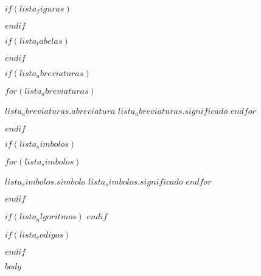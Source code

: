 \documentclass[
	oldfontcommands,
	sumario=abnt-6027-2012,
	12pt,
	openright,
	oneside,
	a4paper,
	english,
	english
	]{imecc-unicamp}
\begin{document}
$if(lista_figuras)$
  \listoffigures*
  \cleardoublepage
$endif$

$if(lista_tabelas)$
  \listoftables*
  \cleardoublepage
$endif$

$if(lista_abreviaturas)$
  \begin{siglas}
    $for(lista_abreviaturas)$
    \item[$lista_abreviaturas.abreviatura$] $lista_abreviaturas.significado$
    $endfor$
  \end{siglas}
$endif$

$if(lista_simbolos)$
\begin{simbolos}
  $for(lista_simbolos)$
  \item[$lista_simbolos.simbolo$] $lista_simbolos.significado$
  $endfor$
\end{simbolos}
$endif$

$if(lista_algoritmos)$
\listofalgorithms
\cleardoublepage
$endif$

$if(lista_codigos)$
\begin{KeepFromToc}
\lstlistoflistings
\end{KeepFromToc}
\cleardoublepage
$endif$

\tableofcontents*
\cleardoublepage

\textual

$body$

\printindex
\end{document}
